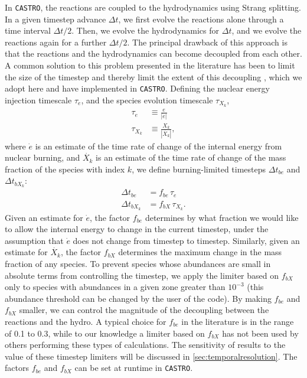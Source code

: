 \documentclass[twocolumn,numberedappendix]{../aastex6}
\newcommand{\castro}{\texttt{CASTRO}}
\begin{document}
In \castro, the reactions are coupled to the hydrodynamics using Strang splitting.
In a given timestep advance $\Delta t$, we first evolve the reactions alone through
a time interval $\Delta t / 2$. Then, we evolve the hydrodynamics for $\Delta t$,
and we evolve the reactions again for a further $\Delta t / 2$. The principal
drawback of this approach is that the reactions and the hydrodynamics can become
decoupled from each other. A common solution to this problem presented in
the literature has been to limit the size of the timestep and thereby limit the
extent of this decoupling \citep{raskin:2010,hawley:2012}, which we adopt here 
and have implemented in \castro. Defining the nuclear energy injection timescale 
$\tau_e$, and the species evolution timescale $\tau_{X_k}$,
\begin{align}
  \tau_e &\equiv \frac{e}{|\dot{e}|} \\
  \tau_{X_k} &\equiv \frac{X_k}{|\dot{X_k}|},
\end{align}
where $\dot{e}$ is an estimate of the time rate of change of the internal energy
from nuclear burning, and $\dot{X_k}$ is an estimate of the time rate of change 
of the mass fraction of the species with index $k$, we define burning-limited 
timesteps $\Delta t_{be}$ and $\Delta t_{bX_k}$:
\begin{align}
  \Delta t_{be} &= f_{be}\, \tau_e \label{eq:timestep_e}\\
  \Delta t_{bX_k} &= f_{bX}\, \tau_{X_k}. \label{eq:timestep_X}
\end{align}
Given an estimate for $\dot{e}$, the factor $f_{be}$ determines by what 
fraction we would like to allow the internal energy to change
in the current timestep, under the assumption that $\dot{e}$ does not change from
timestep to timestep. Similarly, given an estimate for $\dot{X_k}$, the factor $f_{bX}$ 
determines the maximum change in the mass fraction of any species. To prevent species
whose abundances are small in absolute terms from controlling the timestep, we apply
the limiter based on $f_{bX}$ only to species with abundances in a given zone greater
than $10^{-3}$ (this abundance threshold can be changed by the user of the code). By making 
$f_{be}$ and $f_{bX}$ smaller, we can control the magnitude of the decoupling 
between the reactions and the hydro. A typical choice for $f_{be}$ in the
literature is in the range of 0.1 to 0.3, while to our knowledge a limiter based on
$f_{bX}$ has not been used by others performing these types of calculations. The sensitivity
of results to the value of these timestep limiters will be discussed in 
\autoref{sec:temporalresolution}. The factors $f_{be}$ and $f_{bX}$ can be set at runtime in \castro.
\end{document}
